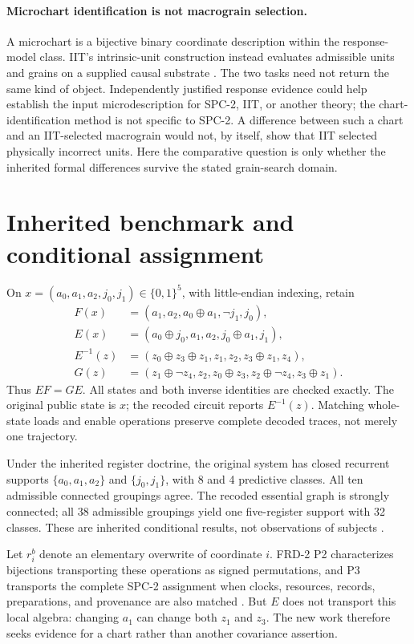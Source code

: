 \documentclass[11pt]{article}
\theoremstyle{definition}\newtheorem{definition}[theorem]{Definition}
\theoremstyle{remark}\newtheorem{remark}[theorem]{Remark}
\newcommand{\B}{\{0,1\}}
\begin{document}
\paragraph{Microchart identification is not macrograin selection.}
A microchart is a bijective binary coordinate description within the response-model class. IIT's intrinsic-unit construction instead evaluates admissible units and grains on a supplied causal substrate \cite{intrinsic}. The two tasks need not return the same kind of object. Independently justified response evidence could help establish the input microdescription for SPC-2, IIT, or another theory; the chart-identification method is not specific to SPC-2. A difference between such a chart and an IIT-selected macrograin would not, by itself, show that IIT selected physically incorrect units. Here the comparative question is only whether the inherited formal differences survive the stated grain-search domain.

\section{Inherited benchmark and conditional assignment}
On $x=(a_0,a_1,a_2,j_0,j_1)\in\B^5$, with little-endian indexing, retain
\begin{align}
F(x)&=(a_1,a_2,a_0\oplus a_1,\neg j_1,j_0),\label{eq:F}\\
E(x)&=(a_0\oplus j_0,a_1,a_2,j_0\oplus a_1,j_1),\label{eq:E}\\
E^{-1}(z)&=(z_0\oplus z_3\oplus z_1,z_1,z_2,z_3\oplus z_1,z_4),\\
G(z)&=(z_1\oplus\neg z_4,z_2,z_0\oplus z_3,z_2\oplus\neg z_4,z_3\oplus z_1).
\end{align}
Thus $EF=GE$. All states and both inverse identities are checked exactly. The original public state is $x$; the recoded circuit reports $E^{-1}(z)$. Matching whole-state loads and enable operations preserve complete decoded traces, not merely one trajectory.

Under the inherited register doctrine, the original system has closed recurrent supports $\{a_0,a_1,a_2\}$ and $\{j_0,j_1\}$, with 8 and 4 predictive classes. All ten admissible connected groupings agree. The recoded essential graph is strongly connected; all 38 admissible groupings yield one five-register support with 32 classes. These are inherited conditional results, not observations of subjects \cite[Section~4, P4]{frd2}.

Let $r_i^b$ denote an elementary overwrite of coordinate $i$. FRD-2 P2 characterizes bijections transporting these operations as signed permutations, and P3 transports the complete SPC-2 assignment when clocks, resources, records, preparations, and provenance are also matched \cite[Section~3.2, P2--P3]{frd2}. But $E$ does not transport this local algebra: changing $a_1$ can change both $z_1$ and $z_3$. The new work therefore seeks evidence for a chart rather than another covariance assertion.
\end{document}
